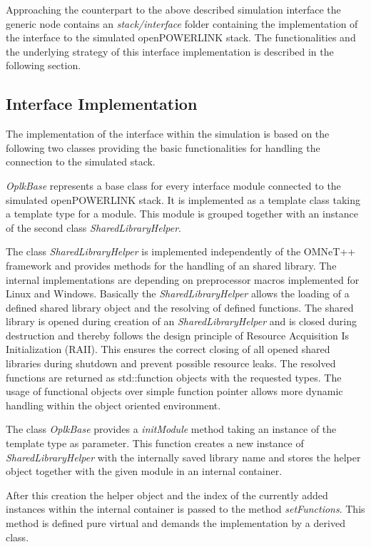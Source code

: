 Approaching the counterpart to the above described simulation interface the generic node contains an \emph{stack/interface} folder containing the implementation of the interface to the simulated openPOWERLINK stack.
The functionalities and the underlying strategy of this interface implementation is described in the following section.

\subsection{Interface Implementation}
\label{sec:porting_stack_interface}
The implementation of the interface within the simulation is based on the following two classes providing the basic functionalities for handling the connection to the simulated stack.

\emph{OplkBase} represents a base class for every interface module connected to the simulated openPOWERLINK stack.
It is implemented as a template class taking a template type for a module.
This module is grouped together with an instance of the second class \emph{SharedLibraryHelper}.

The class \emph{SharedLibraryHelper} is implemented independently of the OMNeT++ framework and provides methods for the handling of an shared library.
The internal implementations are depending on preprocessor macros implemented for Linux and Windows.
Basically the \emph{SharedLibraryHelper} allows the loading of a defined shared library object and the resolving of defined functions.
The shared library is opened during creation of an \emph{SharedLibraryHelper} and is closed during destruction and thereby follows the design principle of Resource Acquisition Is Initialization (RAII).
This ensures the correct closing of all opened shared libraries during shutdown and prevent possible resource leaks.
The resolved functions are returned as std::function objects with the requested types.
The usage of functional objects over simple function pointer allows more dynamic handling within the object oriented environment.

The class \emph{OplkBase} provides a \emph{initModule} method taking an instance of the template type as parameter.
This function creates a new instance of \emph{SharedLibraryHelper} with the internally saved library name and stores the helper object together with the given module in an internal container.

After this creation the helper object and the index of the currently added instances within the internal container is passed to the method \emph{setFunctions}.
This method is defined pure virtual and demands the implementation by a derived class.

